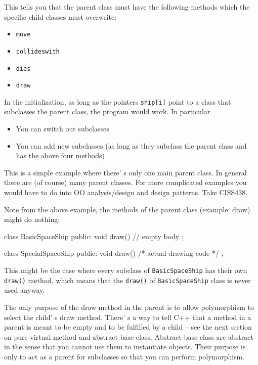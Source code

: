 This tells you that the parent class must have the following methods which the specific child classes must overwrite:

\begin{itemize}
\item
  \verb!move!
\item
  \verb!collideswith!
\item
  \verb!dies!
\item
  \verb!draw!
\end{itemize}

In the initialization, as long as the pointers \texttt{ship[i]} point to a class that subclasses the parent class, the program would work. In particular

\begin{itemize}
\item
  You can switch out subclasses
\item
  You can add new subclasses (as long as they subclass the parent class and has the above four methods)
\end{itemize}

This is a simple example where there' s only one main
parent class. In general there are (of course) many parent classes. For more complicated examples you would have to do into OO analysis/design and design patterns. Take CISS438.

Note from the above example, the methods of the parent class (example: draw) might do nothing:

\begin{console}
class BasicSpaceShip
{
public:
     void draw() {} // empty body
};

class SpecialSpaceShip
{
public:
     void draw() { /* actual drawing code */ }
};
\end{console}

This might be the case where every subclass of \verb!BasicSpaceShip! has their own \verb!draw()! method, which means that the \verb!draw()! of \verb!BasicSpaceShip! class is never used anyway.

The only purpose of the draw method in the parent is to allow polymorphism to select the child' s draw method. There' s a way to tell C++ that a method in a parent is meant to be empty and to be fulfilled by a child -- see the next section on pure virtual method and abstract base class. Abstract base class are abstract in the sense that you cannot use them to instantiate objects. Their purpose is only to act as a parent for subclasses so that you can perform polymorphism.

